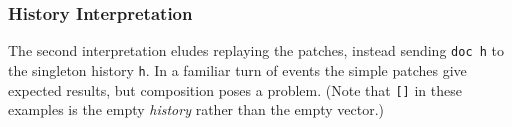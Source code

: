 \subsubsection{History Interpretation}

The second interpretation eludes replaying the patches, instead sending \texttt{doc h}
to the singleton history \texttt{h}. In a familiar turn of events the simple patches give
expected results, but composition poses a problem. (Note that \texttt{[]} in these examples
is the empty \emph{history} rather than the empty vector.)
\begin{code}%
%
\>[2]\AgdaFunction{\AgdaUnderscore{}}\AgdaSpace{}%
\AgdaSymbol{:}\AgdaSpace{}%
\AgdaSpace{}%
\AgdaSpace{}%
\AgdaSymbol{(}\AgdaSpace{}%
\AgdaInductiveConstructor{[]}\AgdaSymbol{)}\AgdaSpace{}%
\AgdaSpace{}%
\AgdaSpace{}%
\AgdaSymbol{(}\AgdaSpace{}%
\AgdaSpace{}%
\AgdaSpace{}%
\AgdaSpace{}%
\AgdaOperator{\AgdaInductiveConstructor{::}}\AgdaSpace{}%
\AgdaInductiveConstructor{[]}\AgdaSymbol{)}\<%
\\
%
\>[2]\AgdaSymbol{\AgdaUnderscore{}}\AgdaSpace{}%
\AgdaSymbol{=}\AgdaSpace{}%
\AgdaSpace{}%
\AgdaSymbol{\AgdaUnderscore{}}\<%
\\
%
\\[\AgdaEmptyExtraSkip]%
%
\>[2]\AgdaFunction{\AgdaUnderscore{}}%
\>[572I]\AgdaSymbol{:}\AgdaSpace{}%
\AgdaSpace{}%
\AgdaSpace{}%
\AgdaSymbol{(}\AgdaSpace{}%
\AgdaSymbol{(}\AgdaSpace{}%
\AgdaSpace{}%
\AgdaSpace{}%
\AgdaSpace{}%
\AgdaOperator{\AgdaInductiveConstructor{::}}\AgdaSpace{}%
\AgdaInductiveConstructor{[]}\AgdaSymbol{))}\<%
\\
\>[.][@{}l@{}]\<[572I]%
\>[4]\AgdaSpace{}%
\AgdaSpace{}%
\AgdaSymbol{(}\AgdaSpace{}%
\AgdaSpace{}%
\AgdaOperator{\AgdaInductiveConstructor{::}}\AgdaSpace{}%
\AgdaSymbol{(}\AgdaSpace{}%
\AgdaSpace{}%
\AgdaSpace{}%
\AgdaSpace{}%
\AgdaOperator{\AgdaInductiveConstructor{::}}\AgdaSpace{}%
\AgdaInductiveConstructor{[]}\AgdaSymbol{))}\<%
\\
%
\>[2]\AgdaSymbol{\AgdaUnderscore{}}\AgdaSpace{}%
\AgdaSymbol{=}\AgdaSpace{}%
\AgdaSpace{}%
\AgdaSymbol{\AgdaUnderscore{}}\<%
\end{code}

